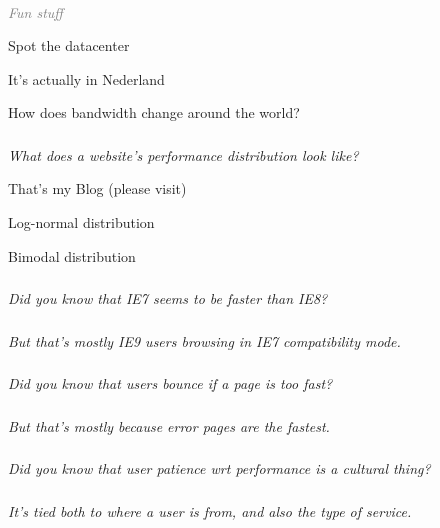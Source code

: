 \documentclass{beamer}
\newcommand{\innersplash}[1]{
  \begin{center}
    \Large \textrm{\textit{ #1 } }
  \end{center}
}
\newcommand{\splashslide}[2][{}]{
  \begin{frame}
  \frametitle{#1}
  \innersplash{#2}
  \end{frame}
}
\newcommand{\leadinslide}[2]{
  \splashslide{
     {\fontsize{150}{20}\selectfont{\raisebox{0pt}[90pt][0pt]{\textcolor{light-gray}{#1}}}} \\ \huge \textcolor{gray}{#2}
  }
}
\begin{document}
\leadinslide{3}{Fun stuff}

\begin{frame}{Spot the datacenter}
\end{frame}

\begin{frame}{It's actually in Nederland}
\end{frame}

\begin{frame}{How does bandwidth change around the world?}
\end{frame}


\splashslide{What does a website's performance distribution look like?}

\begin{frame}{That's my Blog (please visit)}
\end{frame}

\begin{frame}{Log-normal distribution}
\end{frame}

\begin{frame}{Bimodal distribution}
\end{frame}

\splashslide{Did you know that IE7 seems to be faster than IE8?}
\splashslide{But that's mostly IE9 users browsing in IE7 compatibility mode.}

\splashslide{Did you know that users bounce if a page is too fast?}
\splashslide{But that's mostly because error pages are the fastest.}

\splashslide{Did you know that user patience wrt performance is a cultural thing?}
\splashslide{It's tied both to where a user is from, and also the type of service.}
\end{document}
